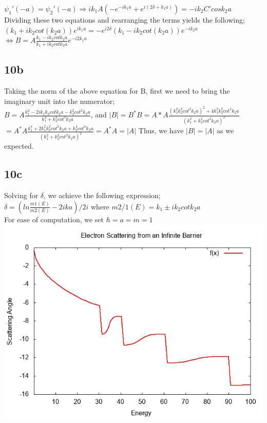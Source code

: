 \documentclass{article}
\begin{document}
$\psi_1'(-a)=\psi_2'(-a)\Rightarrow ik_1A(-e^{-ik_1a}+e^{i(2\delta+k_1a)})=-ik_2C'cosk_2a$\\

Dividing these two equations and rearranging the terms yields the following;\\

$(k_1+ik_2cot(k_2a))e^{ik_1a}=-e^{i2\delta}(k_1-ik_2cot(k_2a))e^{-ik_2a}$\\

$\Leftrightarrow B=A\frac{k_1-ik_2cotk_2a}{k_1+ik_2cotk_2a}e^{-i2k_1a}$\\

\subsection*{10b}

Taking the norm of the above equation for B, first we need to bring the imaginary unit into the numerator;\\

$ B=A\frac{k_1^2-2ik_1k_2cotk_2a-k_2^2cot^2k_2a}{k_1^2+k_2^2cot^2k_2a} $, and $ |B|=B^*B=A*A\frac{(k_1^2k_2^2cot^2k_2a)^2+4k_1^2k_2^2cot^2k_2a}{(k_1^2+k_2^2cot^2k_2a)^2} $\\

$=A^*A\frac{k_1^4+2k_1^2k_2^2cot^2k_2a+k_2^4cot^4k_2a}{(k_1^2+k_2^2cot^2k_2a)^2}=A^*A=|A|$ Thus, we have $|B|=|A|$ as we expected.\\

\subsection*{10c}
Solving for $\delta$, we achieve the following expression;\\

$\delta=(ln\frac{m1(E)}{m2(E)}-2ika)/2i$ where $m2/1(E)=k_1\pm ik_2cotk_2a$\\

For ease of computation, we set $\hbar=a=m=1$\\
\includegraphics[width=\textwidth]{veryverylast.png}
\end{document}
